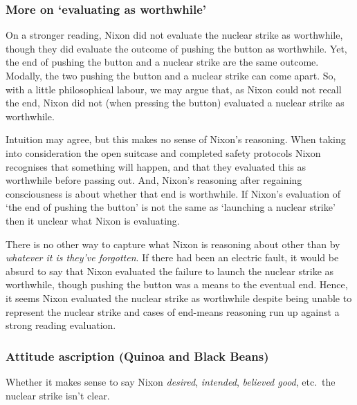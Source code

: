 \documentclass[10pt]{article}
\newcommand{\hozline}[0]{%
  \noindent\hdashrule[0.5ex][c]{\textwidth}{.1pt}{}
}
\begin{document}
\hozline

\subsubsection*{More on `evaluating as worthwhile'}
\label{sec:more-evaluating-as}

On a stronger reading, Nixon did not evaluate the nuclear strike as worthwhile, though they did evaluate the outcome of pushing the button as worthwhile.
Yet, the end of pushing the button and a nuclear strike are the same outcome.
Modally, the two pushing the button and a nuclear strike can come apart.
So, with a little philosophical labour, we may argue that, as Nixon could not recall the end, Nixon did not (when pressing the button) evaluated a nuclear strike as worthwhile.

Intuition may agree, but this makes no sense of Nixon's reasoning.
When taking into consideration the open suitcase and completed safety protocols Nixon recognises that something will happen, and that they evaluated this as worthwhile before passing out.
And, Nixon's reasoning after regaining consciousness is about whether that end is worthwhile.
If Nixon's evaluation of `the end of pushing the button' is not the same as `launching a nuclear strike' then it unclear what Nixon is evaluating.

There is no other way to capture what Nixon is reasoning about other than by \emph{whatever it is they've forgotten}.
If there had been an electric fault, it would be absurd to say that Nixon evaluated the failure to launch the nuclear strike as worthwhile, though pushing the button was a means to the eventual end.
Hence, it seems Nixon evaluated the nuclear strike as worthwhile despite being unable to represent the nuclear strike and cases of end-means reasoning run up against a strong reading evaluation.

\hozline

\subsubsection*{Attitude ascription \hfill (Quinoa and Black Beans)}
\label{sec:attitude-ascriptions}

Whether it makes sense to say Nixon \emph{desired}, \emph{intended}, \emph{believed good}, etc.\ the nuclear strike isn't clear.
\end{document}
